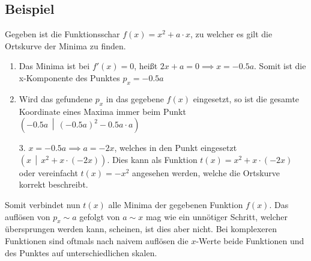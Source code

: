 \documentclass{article}
\begin{document}
\subsection{Beispiel}
Gegeben ist die Funktionsschar $f(x)=x^2+a \cdot x$, zu welcher es gilt die Ortskurve der Minima zu finden. 
\begin{enumerate}
 \item Das Minima ist bei $f'(x)=0$, heißt $2x+a=0 \implies x=-0.5a$. Somit ist die x-Komponente des Punktes $p_x=-0.5a$
 \item Wird das gefundene $p_x$ in das gegebene $f(x)$ eingesetzt, so ist die gesamte Koordinate eines Maxima immer beim Punkt $\left(-0.5a \,\middle|\, \left(-0.5a\right)^2-0.5a \cdot a\right)$
\end{enumerate}
  
\begin{minipage}[t]{\dimexpr\textwidth-5cm} 
 \begin{enumerate} 
 \item[3.] $x = -0.5a \implies a = -2x$, welches in den Punkt eingesetzt $\left(x \,\middle|\, x^2+x \cdot \left(-2x\right)\right)$. Dies kann als Funktion $t(x)=x^2+x \cdot (-2x)$ oder vereinfacht $t(x)=-x^2$ angesehen werden, welche die Ortskurve korrekt beschreibt.
 \end{enumerate}
 Somit verbindet nun $t(x)$ alle Minima der gegebenen Funktion $f(x)$. \newline
 Das auflösen von $p_x \sim a$ gefolgt von $a \sim x$ mag wie ein unnötiger Schritt, welcher übersprungen werden kann, scheinen, ist dies aber nicht. Bei komplexeren Funktionen sind oftmals nach naivem auflösen die $x$-Werte beide Funktionen und des Punktes auf unterschiedlichen skalen.
\end{minipage} 
\hfill 
\begin{minipage}[t]{5cm} 
 \centering
\end{minipage} 
 
 
\end{document}
